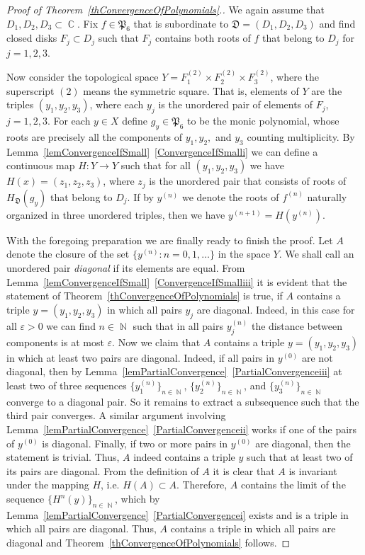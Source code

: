 \documentclass{amsart}
\numberwithin{equation}{section}
\theoremstyle{definition}
\theoremstyle{remark}
\DeclareMathOperator{\CC}{\mathbb C}
\DeclareMathOperator{\NN}{\mathbb N}
\begin{document}
	\begin{proof}[Proof of Theorem~\ref{thConvergenceOfPolynomials}.]
		We again assume that $D_1,D_2,D_3 \subset \CC$. Fix $f \in \mathfrak P_6$ that is subordinate to $\mathfrak D = (D_1,D_2,D_3)$ and find closed disks $F_j \subset D_j$ such that $F_j$ contains both roots of $f$ that belong to $D_j$ for $j = 1,2,3$.
		
		Now consider the topological space $Y = F_1^{(2)} \times F_2^{(2)} \times F_3^{(2)}$, where the superscript $(2)$ means the symmetric square. That is, elements of $Y$ are the triples $(y_1,y_2,y_3)$, where each $y_j$ is the unordered pair of elements of $F_j$, $j = 1,2,3$. For each $y \in X$ define $g_y \in \mathfrak P_6$ to be the monic polynomial, whose roots are precisely all the components of $y_1,y_2,$ and $y_3$ counting multiplicity. By Lemma~\ref{lemConvergenceIfSmall}~\ref{ConvergenceIfSmalli} we can define a continuous map $H:Y \to Y$ such that for all $(y_1,y_2,y_3)$ we have $H(x) = (z_1,z_2,z_3)$, where $z_j$ is the unordered pair that consists of roots of $H_{\mathfrak D}(g_y)$ that belong to $D_j$. If by $y^{(n)}$ we denote the roots of $f^{(n)}$ naturally organized in three unordered triples, then we have $y^{(n+1)} = H(y^{(n)})$. 
		
		With the foregoing preparation we are finally ready to finish the proof. Let $A$ denote the closure of the set $\{y^{(n)}: n = 0,1,\dots\}$ in the space $Y$. We shall call an unordered pair {\it{diagonal}} if its elements are equal. From Lemma~\ref{lemConvergenceIfSmall}~\ref{ConvergenceIfSmalliii} it is evident that the statement of Theorem~\ref{thConvergenceOfPolynomials} is true, if $A$ contains a triple $y = (y_1,y_2,y_3)$ in which all pairs $y_j$ are diagonal. Indeed, in this case for all $\varepsilon > 0$ we can find $n \in \NN$ such that in all pairs $y^{(n)}_j$ the distance between components is at most $\varepsilon$. Now we claim that $A$ contains a triple $y = (y_1,y_2,y_3)$ in which at least two pairs are diagonal. Indeed, if all pairs in $y^{(0)}$ are not diagonal, then by Lemma~\ref{lemPartialConvergence}~\ref{PartialConvergenceiii} at least two of three sequences $\{y^{(n)}_1\}_{n \in \NN}$, $\{y^{(n)}_2\}_{n \in \NN}$, and $\{y^{(n)}_3\}_{n \in \NN}$ converge to a diagonal pair. So it remains to extract a subsequence such that the third pair converges. A similar argument involving Lemma~\ref{lemPartialConvergence}~\ref{PartialConvergenceii} works if one of the pairs of $y^{(0)}$ is diagonal. Finally, if two or more pairs in $y^{(0)}$ are diagonal, then the statement is trivial. Thus, $A$ indeed contains a triple $y$ such that at least two of its pairs are diagonal. From the definition of $A$ it is clear that $A$ is invariant under the mapping $H$, i.e. $H(A) \subset A$. Therefore, $A$ contains the limit of the sequence $\{H^n(y)\}_{n \in \NN}$, which by Lemma~\ref{lemPartialConvergence}~\ref{PartialConvergencei} exists and is a triple in which all pairs are diagonal. Thus, $A$ contains a triple in which all pairs are diagonal and Theorem~\ref{thConvergenceOfPolynomials} follows.
	\end{proof}
	
\end{document}
